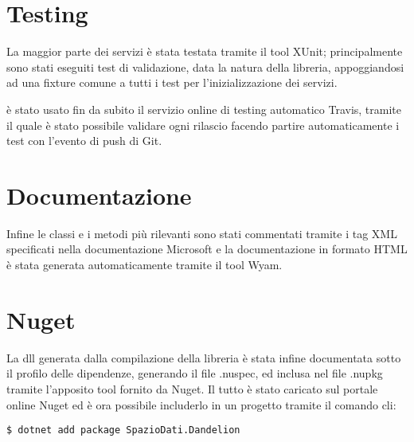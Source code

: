 \section{Testing}
La maggior parte dei servizi è stata testata tramite il tool XUnit; principalmente sono stati eseguiti test di validazione, data la natura della libreria, appoggiandosi 
ad una fixture comune a tutti i test per l'inizializzazione dei servizi.

è stato usato fin da subito il servizio online di testing automatico Travis, tramite il quale è stato possibile validare ogni rilascio facendo 
partire automaticamente i test con l'evento di push di Git. 

\section{Documentazione}
Infine le classi e i metodi più rilevanti sono stati commentati tramite i tag XML specificati nella documentazione Microsoft e la documentazione in formato 
HTML è stata generata automaticamente tramite il tool Wyam.

\section{Nuget}
La dll generata dalla compilazione della libreria è stata infine documentata sotto il profilo delle dipendenze, generando il file .nuspec, ed inclusa nel file .nupkg
tramite l'apposito tool fornito da Nuget. Il tutto è stato caricato sul portale online Nuget ed è ora possibile includerlo in un progetto tramite il comando cli:

\begin{lstlisting}[style=TexStyle]
$ dotnet add package SpazioDati.Dandelion
\end{lstlisting}